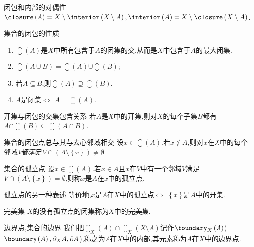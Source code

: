 \begin{proposition}{闭包和内部的对偶性}{}
	$\closure\left(A\right)=X\setminus\interior\left(X\setminus A\right),\interior\left(A\right)=X\setminus\closure\left(X\setminus A\right)$.
\end{proposition}

\begin{proposition}{集合的闭包的性质}{}
	\begin{enumerate}
		\item $\closure\left(A\right)$是$X$中所有包含于$A$的闭集的交,从而是$X$中包含于$A$的最大闭集.
		\item $\closure\left(A\cup B\right)=\closure\left(A\right)\cup\closure\left(B\right)$;
		\item 若$A\subseteq B$,则$\closure\left(A\right)\supseteq\closure\left(B\right)$.
		\item $A$是闭集$\iff$ $A=\closure\left(A\right)$.
	\end{enumerate}
\end{proposition}

\begin{proposition}{开集与闭包的交集包含关系}{}
	若$A$是$X$中的开集,则对$X$的每个子集$B$都有$A\cap\closure\left(B\right)\subseteq\closure\left(A\cap B\right)$.
\end{proposition}

\begin{proposition}{集合的闭包点总与其与去心邻域相交}{}
	设$x\in\closure\left(A\right)$.若$x\notin A$,则对$x$在$X$中的每个邻域$V$都满足$V\cap\left(A\setminus\left\{x\right\}\right)\neq\emptyset$.
\end{proposition}

\begin{definition}{集合的孤立点}{}
	设$x\in\closure\left(A\right)$.若$x\in A$且$x$在$V$中有一个邻域$V$满足$V\cap\left(A\setminus\left\{x\right\}\right)=\emptyset$,则称$x$是$A$在$x$中的孤立点.
\end{definition}

\begin{remark}{孤立点的另一种表述}{}
	等价地,$x$是$A$在$X$中的孤立点$\iff$ $\left\{x\right\}$是$A$中的开集.
\end{remark}

\begin{definition}{完美集}{}
	$X$的没有孤立点的闭集称为$X$中的完美集.
\end{definition}

\begin{definition}{边界点,集合的边界}{}
	我们把$\closure_{X}\left(A\right)\cap\closure_{X}\left(X\setminus A\right)$记作$\boundary_{X}\left(A\right)$($\boundary\left(A\right),\partial_{X}A,\partial A$),称之为$A$在$X$中的内部,其元素称为$A$在$X$中的边界点.
\end{definition}

